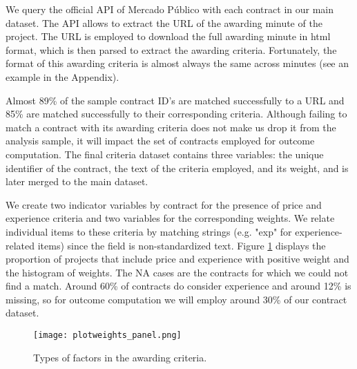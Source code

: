 We query the official API of Mercado Público with each contract in our main dataset. The API allows to extract the URL of the awarding minute of the project. The URL is employed to download the full awarding minute in html format, which is then parsed to extract the awarding criteria. Fortunately, the format of this awarding criteria is almost always the same across minutes (see an example in the Appendix).

Almost 89\% of the sample contract ID's are matched successfully to a URL and 85\% are matched successfully to their corresponding criteria. Although failing to match a contract with its awarding criteria does not make us drop it from the analysis sample, it will impact the set of contracts employed for outcome computation. The final criteria dataset contains three variables: the unique identifier of the contract, the text of the criteria employed, and its weight, and is later merged to the main dataset.

We create two indicator variables by contract for the presence of price and experience criteria and two variables for the corresponding weights. We relate individual items to these criteria by matching strings (e.g. "exp" for experience-related items) since the field is non-standardized text. Figure \ref{fig:plotweights_panel} displays the proportion of projects that include price and experience with positive weight and the histogram of weights. The NA cases are the contracts for which we could not find a match. Around 60\% of contracts do consider experience and around 12\% is missing, so for outcome computation we will employ around 30\% of our contract dataset.

\begin{figure}
  \texttt{[image: plotweights\_panel.png]}
  \caption{Types of factors in the awarding criteria.}
  \label{fig:plotweights_panel}
\end{figure}
